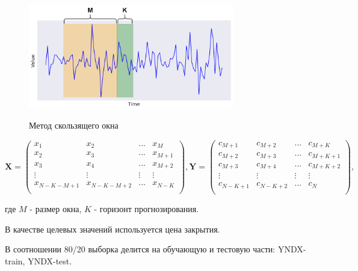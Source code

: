 \begin{figure}[h!t]\center
{\includegraphics[width=0.8\textwidth]{results/slidingwindow.png}}
\caption{Метод скользящего окна}
\end{figure}

\small
\[
\mathbf{X} = 
\begin{pmatrix}
x_{1} & x_{2} & ... & x_{M}\\
x_{2} & x_{3} & ... & x_{M+1} \\
x_{3} & x_{4} & ... & x_{M+2} \\
\vdots & \vdots & \vdots & \vdots \\
x_{N-K-M+1} & x_{N-K-M+2} & ... & x_{N-K} \\
\end{pmatrix},
\mathbf{Y} = \begin{pmatrix}
c_{M+1} & c_{M+2} & ... & c_{M+K}\\
c_{M+2} & c_{M+3} & ... & c_{M+K+1} \\
c_{M+3} & c_{M+4} & ... & c_{M+K+2} \\
\vdots & \vdots & \vdots & \vdots \\
c_{N-K+1} & c_{N-K+2} & ... & c_{N} \\
\end{pmatrix},
\]
\normalsize

где  $M$ - размер окна, $K$ - горизонт прогнозирования.

\bigskip

В качестве целевых значений используется цена закрытия.

\bigskip

В соотношении 80/20 выборка делится на обучающую и тестовую части: YNDX-train, YNDX-test.